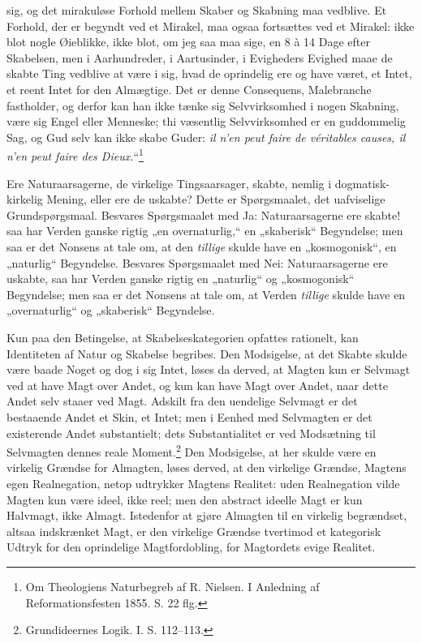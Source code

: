 \documentclass[12pt]{book}
\newcommand{\opage}[1]{\marginnote{\footnotesize\textit{[#1]}}}
\begin{document}
sig, og det mirakuløse Forhold mellem Skaber og Skabning
maa vedblive. Et Forhold, der er begyndt ved et Mirakel,
maa ogsaa fortsættes ved et Mirakel: ikke blot nogle Øieblikke,
ikke blot, om jeg saa maa sige, en 8 à 14 Dage efter
Skabelsen, men i Aarhundreder, i Aartusinder, i Evigheders
Evighed maae de skabte Ting vedblive at være i sig, hvad de
\opage{163}oprindelig ere og have været, et Intet, et reent Intet for den
Almægtige. Det er denne Consequens, Malebranche fastholder,
og derfor kan han ikke tænke sig Selvvirksomhed i nogen
Skabning, være sig Engel eller Menneske; thi væsentlig Selvvirksomhed
er en guddommelig Sag, og Gud selv kan ikke
skabe Guder: \textit{il n'en peut faire de véritables causes, il
n'en peut faire des Dieux.}“\footnote{Om Theologiens Naturbegreb af R. Nielsen. I Anledning af Reformationsfesten 1855. S. 22 flg.} %

Ere Naturaarsagerne, de virkelige Tingsaarsager, skabte,
nemlig i dogmatisk-kirkelig Mening, eller ere de uskabte? Dette
er Spørgsmaalet, det uafviselige Grundspørgsmaal. Besvares
Spørgsmaalet med Ja: Naturaarsagerne ere skabte! saa har
Verden ganske rigtig „en overnaturlig,“ en „skaberisk“ Begyndelse;
men saa er det Nonsens at tale om, at den \emph{tillige}
skulde have en „kosmogonisk“, en „naturlig“ Begyndelse. Besvares
Spørgsmaalet med Nei: Naturaarsagerne ere uskabte,
saa har Verden ganske rigtig en „naturlig“ og „kosmogonisk“
Begyndelse; men saa er det Nonsens at tale om, at Verden
\emph{tillige} skulde have en „overnaturlig“ og „skaberisk“ Begyndelse.

Kun paa den Betingelse, at Skabelseskategorien opfattes
rationelt, kan Identiteten af Natur og Skabelse begribes. Den
Modsigelse, at det Skabte skulde være baade Noget og dog i
sig Intet, løses da derved, at Magten kun er Selvmagt
ved at have Magt over Andet, og kun kan have Magt over
Andet, naar dette Andet selv staaer ved Magt. Adskilt fra
den uendelige Selvmagt er det bestaaende Andet et Skin, et
Intet; men i Eenhed med Selvmagten er det existerende
Andet substantielt; dets Substantialitet er ved Modsætning
til Selvmagten dennes reale Moment.\footnote{Grundideernes Logik. I. S. 112--113.} %
Den Modsigelse,
at her skulde være en virkelig Grændse for Almagten, løses
\opage{164}derved, at den virkelige Grændse, Magtens egen Realnegation,
netop udtrykker Magtens Realitet: uden Realnegation vilde
Magten kun være ideel, ikke reel; men den abstract ideelle
Magt er kun Halvmagt, ikke Almagt. Istedenfor at gjøre
Almagten til en virkelig begrændset, altsaa indskrænket Magt,
er den virkelige Grændse tvertimod et kategorisk Udtryk for
den oprindelige Magtfordobling, for Magtordets evige Realitet.
\end{document}
